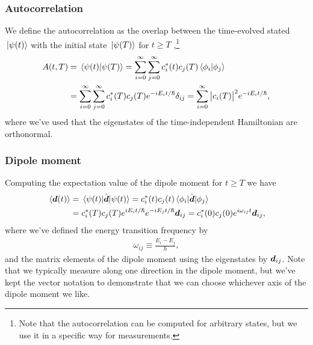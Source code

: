             \subsubsection{Autocorrelation}
                We define the autocorrelation as the overlap between the
                time-evolved stated $\ket*{\psi(t)}$ with the initial state
                $\ket*{\psi(T)}$ for $t \geq T$ \cite{robinett20041,
                pedersen2018symplectic},\footnote{%
                    Note that the autocorrelation can be computed for arbitrary
                    states, but we use it in a specific way for measurements.
                }
                \begin{align}
                    A(t, T)
                    &= \braket*{\psi(t)}{\psi(T)}
                    =
                    \sum_{i = 0}^{\infty}
                    \sum_{j = 0}^{\infty}
                    c^{*}_i(t) c_j(T)
                    \braket*{\phi_i}{\phi_j}
                    \\
                    &=
                    \sum_{i = 0}^{\infty}
                    \sum_{j = 0}^{\infty}
                    c^{*}_i(T) c_j(T) e^{-i E_i t/\hslash}
                    \delta_{ij}
                    =
                    \sum_{i = 0}^{\infty}
                    \abs{c_i(T)}^2 e^{-i E_i t/\hslash},
                    \label{eq:autocorrelation}
                \end{align}
                where we've used that the eigenstates of the time-independent
                Hamiltonian are orthonormal.

            \subsubsection{Dipole moment}
                Computing the expectation value of the dipole moment for $t \geq
                T$ we have
                \begin{align}
                    \expval*{\boldsymbol{d}(t)}
                    &= \mel*{\psi(t)}{\hat{\boldsymbol{d}}}{\psi(t)}
                    =
                    c^{*}_i(t)c_j(t)\mel*{\phi_i}{\hat{\boldsymbol{d}}}{\phi_j}
                    \\
                    &=
                    c^{*}_i(T)c_j(T) e^{i E_i t/\hslash}
                    e^{-i E_j t / \hslash}
                    \boldsymbol{d}_{ij}
                    =
                    c^{*}_i(0)c_j(0) e^{i \omega_{ij} t}
                    \boldsymbol{d}_{ij},
                \end{align}
                where we've defined the energy transition frequency by
                \begin{align}
                    \omega_{ij} \equiv \frac{E_i - E_j}{\hslash},
                \end{align}
                and the matrix elements of the dipole moment using the
                eigenstates by $\boldsymbol{d}_{ij}$.
                Note that we typically measure along one direction in the dipole
                moment, but we've kept the vector notation to demonstrate that
                we can choose whichever axis of the dipole moment we like.

